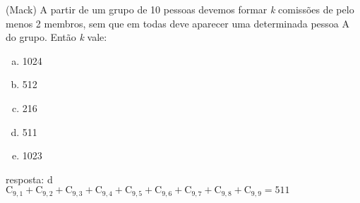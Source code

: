 \begin{ex}
 	(Mack) A partir de um grupo de 10 pessoas devemos formar \textit{k}  comissões de pelo menos 2 membros, sem que em todas deve aparecer uma determinada pessoa A do grupo. Então \textit{k}  vale:   
    \begin{enumerate}[(a)]
    \item 1024
    \item 512
    \item 216
    \item 511
    \item 1023
    \end{enumerate}
      \begin{sol}
       resposta: d \\
       $\mathrm{C}_{9,1}+\mathrm{C}_{9,2}+\mathrm{C}_{9,3}+\mathrm{C}_{9,4}+\mathrm{C}_{9,5}+\mathrm{C}_{9,6}+\mathrm{C}_{9,7}+\mathrm{C}_{9,8}+\mathrm{C}_{9,9}=511$
      \end{sol}
\end{ex}